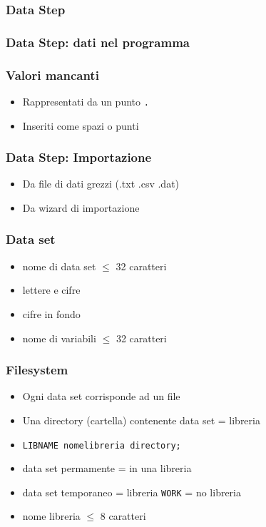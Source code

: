 \documentclass[aspectratio=169]{beamer}
\begin{document}
\begin{frame}[fragile]\frametitle{Data Step}
\end{frame}

\begin{frame}\frametitle{Data Step: dati nel programma}
\end{frame}


\begin{frame}\frametitle{Valori mancanti}
  \begin{itemize}
  \item
    Rappresentati da un punto \texttt{.}
  \item
    Inseriti come spazi o punti
  \end{itemize}\end{frame}

\begin{frame}\frametitle{Data Step: Importazione}
  \begin{itemize}
  \item
    Da file di dati grezzi (.txt .csv .dat)
  \item
    Da wizard di importazione
  \end{itemize}
\end{frame}

\begin{frame}\frametitle{Data set}
  \begin{itemize}
  \item
    nome di data set $\le$ 32 caratteri
  \item
    lettere e cifre
  \item
    cifre in fondo
  \item
    nome di variabili $\le$ 32 caratteri
  \end{itemize}
\end{frame}


\begin{frame}\frametitle{Filesystem}
  \begin{itemize}
  \item
    Ogni data set corrisponde ad un file
  \item
    Una directory (cartella) contenente data set = \alert{libreria}
  \item
    \texttt{LIBNAME nomelibreria directory;}
  \item
    data set permamente = in una libreria
  \item
    data set temporaneo = libreria \texttt{WORK} = no libreria
  \item
    nome libreria $\le$ 8 caratteri
  \end{itemize}\end{frame}
\end{document}

